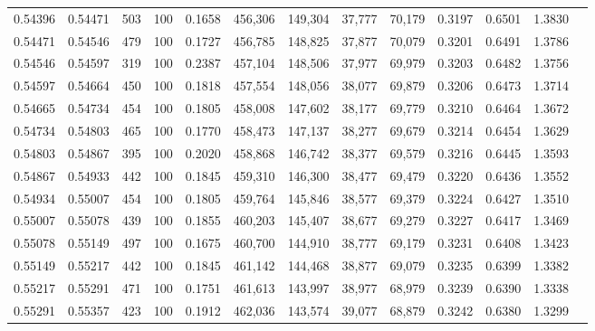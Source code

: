 \begin{tabular}{rrrrrrrrrrrrr}
0.54396 & 0.54471 &   503 & 100 &                                     0.1658 & 456,306 & 149,304 &  37,777 &  70,179 & 0.3197 & 0.6501 & 1.3830 \\
0.54471 & 0.54546 &   479 & 100 &                                     0.1727 & 456,785 & 148,825 &  37,877 &  70,079 & 0.3201 & 0.6491 & 1.3786 \\
0.54546 & 0.54597 &   319 & 100 &                                     0.2387 & 457,104 & 148,506 &  37,977 &  69,979 & 0.3203 & 0.6482 & 1.3756 \\
0.54597 & 0.54664 &   450 & 100 &                                     0.1818 & 457,554 & 148,056 &  38,077 &  69,879 & 0.3206 & 0.6473 & 1.3714 \\
0.54665 & 0.54734 &   454 & 100 &                                     0.1805 & 458,008 & 147,602 &  38,177 &  69,779 & 0.3210 & 0.6464 & 1.3672 \\
0.54734 & 0.54803 &   465 & 100 &                                     0.1770 & 458,473 & 147,137 &  38,277 &  69,679 & 0.3214 & 0.6454 & 1.3629 \\
0.54803 & 0.54867 &   395 & 100 &                                     0.2020 & 458,868 & 146,742 &  38,377 &  69,579 & 0.3216 & 0.6445 & 1.3593 \\
0.54867 & 0.54933 &   442 & 100 &                                     0.1845 & 459,310 & 146,300 &  38,477 &  69,479 & 0.3220 & 0.6436 & 1.3552 \\
0.54934 & 0.55007 &   454 & 100 &                                     0.1805 & 459,764 & 145,846 &  38,577 &  69,379 & 0.3224 & 0.6427 & 1.3510 \\
0.55007 & 0.55078 &   439 & 100 &                                     0.1855 & 460,203 & 145,407 &  38,677 &  69,279 & 0.3227 & 0.6417 & 1.3469 \\
0.55078 & 0.55149 &   497 & 100 &                                     0.1675 & 460,700 & 144,910 &  38,777 &  69,179 & 0.3231 & 0.6408 & 1.3423 \\
0.55149 & 0.55217 &   442 & 100 &                                     0.1845 & 461,142 & 144,468 &  38,877 &  69,079 & 0.3235 & 0.6399 & 1.3382 \\
0.55217 & 0.55291 &   471 & 100 &                                     0.1751 & 461,613 & 143,997 &  38,977 &  68,979 & 0.3239 & 0.6390 & 1.3338 \\
0.55291 & 0.55357 &   423 & 100 &                                     0.1912 & 462,036 & 143,574 &  39,077 &  68,879 & 0.3242 & 0.6380 & 1.3299 \\

\end{tabular}

